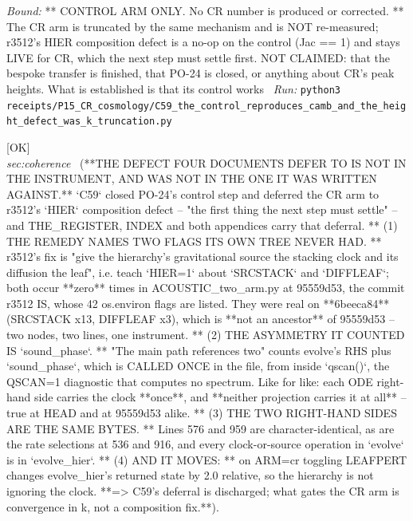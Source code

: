 \begin{description}
 \emph{Bound:} ** CONTROL ARM ONLY. No CR number is produced or corrected. ** The CR arm is truncated by the same mechanism and is NOT re-measured; r3512's HIER composition defect is a no-op on the control (Jac == 1) and stays LIVE for CR, which the next step must settle first. NOT CLAIMED: that the bespoke transfer is finished, that PO-24 is closed, or anything about CR's peak heights. What is established is that its control works
\ \emph{Run:} \texttt{python3 receipts/P15\_CR\_cosmology/C59\_the\_control\_reproduces\_camb\_and\_the\_height\_defect\_was\_k\_truncation.py}
\item[\rcptlabel{C60_the_hier_composition_defect_names_two_flags_its_own_tree_never_had}{P15R109}\textbf{P15R109}\quad\texttt{C60\_the\_hier\_composition\_defect\_names\_two\_flags\_its\_own\_tree\_never\_had}]\hfill\textsf{[OK]}\\
\textit{sec:coherence} \ (**THE DEFECT FOUR DOCUMENTS DEFER TO IS NOT IN THE INSTRUMENT, AND WAS NOT IN THE ONE IT WAS WRITTEN AGAINST.** `C59` closed PO-24's control step and deferred the CR arm to r3512's `HIER` composition defect -- "the first thing the next step must settle" -- and THE\_REGISTER, INDEX and both appendices carry that deferral. ** (1) THE REMEDY NAMES TWO FLAGS ITS OWN TREE NEVER HAD. ** r3512's fix is "give the hierarchy's gravitational source the stacking clock and its diffusion the leaf", i.e. teach `HIER=1` about `SRCSTACK` and `DIFFLEAF`; both occur **zero** times in ACOUSTIC\_two\_arm.py at 95559d53, the commit r3512 IS, whose 42 os.environ flags are listed. They were real on **6beeca84** (SRCSTACK x13, DIFFLEAF x3), which is **not an ancestor** of 95559d53 -- two nodes, two lines, one instrument. ** (2) THE ASYMMETRY IT COUNTED IS `sound\_phase`. ** "The main path references two" counts evolve's RHS plus `sound\_phase`, which is CALLED ONCE in the file, from inside `qscan()`, the QSCAN=1 diagnostic that computes no spectrum. Like for like: each ODE right-hand side carries the clock **once**, and **neither projection carries it at all** -- true at HEAD and at 95559d53 alike. ** (3) THE TWO RIGHT-HAND SIDES ARE THE SAME BYTES. ** Lines 576 and 959 are character-identical, as are the rate selections at 536 and 916, and every clock-or-source operation in `evolve` is in `evolve\_hier`. ** (4) AND IT MOVES: ** on ARM=cr toggling LEAFPERT changes evolve\_hier's returned state by 2.0 relative, so the hierarchy is not ignoring the clock. **=> C59's deferral is discharged; what gates the CR arm is convergence in k, not a composition fix.**). 

\end{description}
